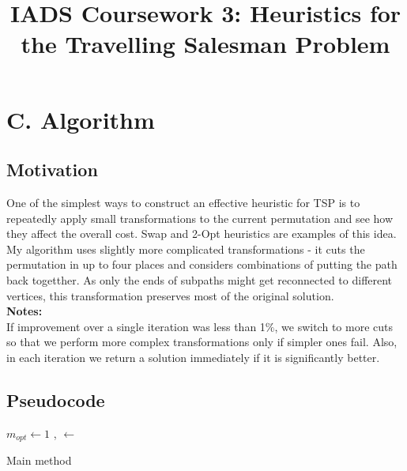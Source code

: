\documentclass[12pt]{article}
\begin{document}
 
 
\title{IADS Coursework 3: Heuristics for the Travelling Salesman Problem}


\maketitle
\newpage
\section*{C. Algorithm}
\subsection*{Motivation}
One of the simplest ways to construct an effective heuristic for TSP is to repeatedly apply small transformations to the current permutation and see how they affect the overall cost. Swap and 2-Opt heuristics are examples of this idea. My algorithm uses slightly more complicated transformations - it cuts the permutation in up to four places and considers combinations of putting the path back togetther. As only the ends of subpaths might get reconnected to different vertices, this transformation preserves most of the original solution.\\
\textbf{Notes:}\\
If improvement over a single iteration was less than 1$\%$, we switch to more cuts so that we perform more complex transformations only if simpler ones fail. Also, in each iteration we return a solution immediately if it is significantly better.

\subsection*{Pseudocode}

\begin{algorithm}[H]
 $m_{opt} \leftarrow 1$ \;
  {
  \Improvement, \Perm $\leftarrow$ \;
 }
 \caption{Main method}
 
 
\end{algorithm}
\end{document}
